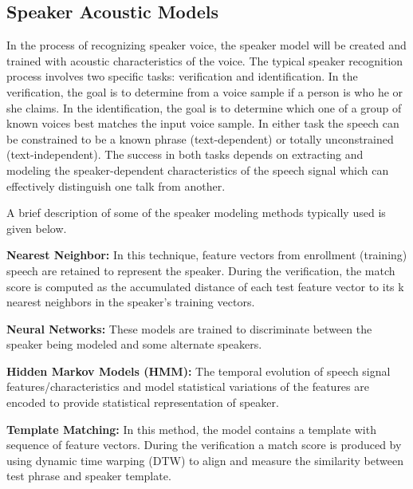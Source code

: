 \documentclass[sigconf]{acmart}
\begin{document}
\subsection{Speaker Acoustic Models}
In the process of recognizing speaker voice, the speaker model will be created and trained with acoustic characteristics of the voice. The typical speaker recognition process involves two specific tasks: verification and identification. In the verification, the goal is to determine from a voice sample if a person is who he or she claims. In the identification, the goal is to determine which one of a group of known voices best matches the input voice sample. In either task the speech can be constrained to be a known phrase (text-dependent) or totally unconstrained (text-independent). The success in both tasks depends on extracting and modeling the speaker-dependent characteristics of the speech signal which can effectively distinguish one talk from another.

A brief description of some of the speaker modeling methods typically used is given below.
\par\null\par
\textbf{Nearest Neighbor:} In this technique, feature vectors from enrollment (training) speech are retained to represent the speaker. During the verification, the match score is computed as the accumulated distance of each test feature vector to its k nearest neighbors in the speaker's training vectors.

\textbf{Neural Networks:} These models are trained to discriminate between the speaker being modeled and some alternate speakers.

\textbf{Hidden Markov Models (HMM):}  The temporal evolution of speech signal
features/characteristics and model statistical variations of the features are encoded to provide statistical representation of speaker.

\textbf{Template Matching:} In this method, the model contains a template with sequence of feature vectors. During the verification a match score is produced by using dynamic time warping (DTW) to align and measure the similarity between test phrase and speaker template.
\end{document}
